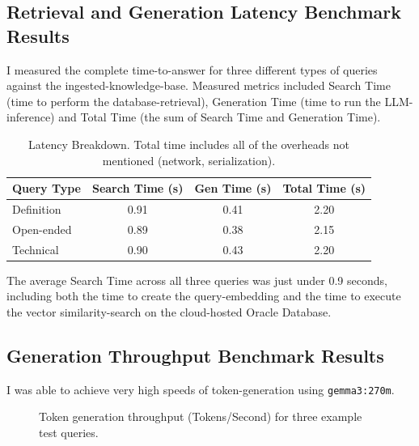 \documentclass[11pt,a4paper]{article}
\begin{document}
\subsection{Retrieval and Generation Latency Benchmark Results}

I measured the complete time-to-answer for three different types of queries against the ingested-knowledge-base. Measured metrics included Search Time (time to perform the database-retrieval), Generation Time (time to run the LLM-inference) and Total Time (the sum of Search Time and Generation Time).

\begin{table}[h]
\centering
\begin{tabular}{@{}lccc@{}}
\toprule
\textbf{Query Type} & \textbf{Search Time (s)} & \textbf{Gen Time (s)} & \textbf{Total Time (s)} \\ \midrule
Definition & 0.91 & 0.41 & 2.20 \\
Open-ended & 0.89 & 0.38 & 2.15 \\
Technical & 0.90 & 0.43 & 2.20 \\ \bottomrule
\end{tabular}
\caption{Latency Breakdown. Total time includes all of the overheads not mentioned (network, serialization).}
\label{tab:latency}
\end{table}

The average Search Time across all three queries was just under 0.9 seconds, including both the time to create the query-embedding and the time to execute the vector similarity-search on the cloud-hosted Oracle Database.

\subsection{Generation Throughput Benchmark Results}

I was able to achieve very high speeds of token-generation using \texttt{gemma3:270m}.

\begin{figure}[h]
\centering
{}
\caption{Token generation throughput (Tokens/Second) for three example test queries.}
\label{fig:throughput}
\end{figure}
\end{document}
